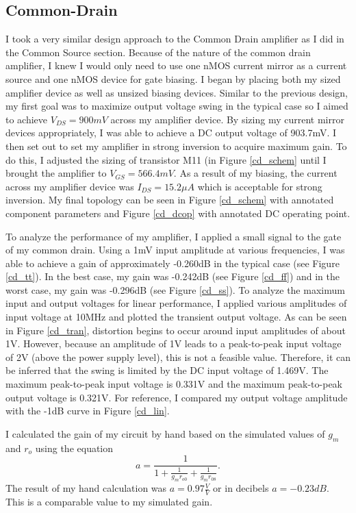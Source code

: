 \documentclass{article}
\begin{document}
\subsection{Common-Drain}
I took a very similar design approach to the Common Drain amplifier as I did in the Common Source section. Because of the nature of the common drain amplifier, I knew I would only need to use one nMOS current mirror as a current source and one nMOS device for gate biasing. I began by placing both my sized amplifier device as well as unsized biasing devices. Similar to the previous design, my first goal was to maximize output voltage swing in the typical case so I aimed to achieve $V_{DS} = 900mV$ across my amplifier device. By sizing my current mirror devices appropriately, I was able to achieve a DC output voltage of 903.7mV. I then set out to set my amplifier in strong inversion to acquire maximum gain. To do this, I adjusted the sizing of transistor M11 (in Figure \ref{cd_schem} until I brought the amplifier to $V_{GS} = 566.4mV$. As a result of my biasing, the current across my amplifier device was $I_{DS} = 15.2\mu A$ which is acceptable for strong inversion. My final topology can be seen in Figure \ref{cd_schem} with annotated component parameters and Figure \ref{cd_dcop} with annotated DC operating point.

To analyze the performance of my  amplifier, I applied a small signal to the gate of my common drain. Using a 1mV input amplitude at various frequencies, I was able to achieve a gain of approximately -0.260dB in the typical case (see Figure \ref{cd_tt}). In the best case, my gain was -0.242dB (see Figure \ref{cd_ff}) and in the worst case, my gain was -0.296dB (see Figure \ref{cd_ss}). To analyze the maximum input and output voltages for linear performance, I applied various amplitudes of input voltage at 10MHz and plotted the transient output voltage. As can be seen in Figure \ref{cd_tran}, distortion begins to occur around input amplitudes of about 1V. However, because an amplitude of 1V leads to a peak-to-peak input voltage of 2V (above the power supply level), this is not a feasible value. Therefore, it can be inferred that the swing is limited by the DC input voltage of 1.469V. The maximum peak-to-peak input voltage is 0.331V and the maximum peak-to-peak output voltage is 0.321V. For reference, I compared my output voltage amplitude with the -1dB curve in Figure \ref{cd_lin}.

I calculated the gain of my circuit by hand based on the simulated values of $g_m$ and $r_o$ using the equation
\begin{equation}
a = \frac{1}{1+\frac{1}{g_mr_{o0}}+\frac{1}{g_mr_{08}}}.
\end{equation}
The result of my hand calculation was $a = 0.97\frac{V}{V}$ or in decibels $a = -0.23dB$. This is a comparable value to my simulated gain.
\end{document}
